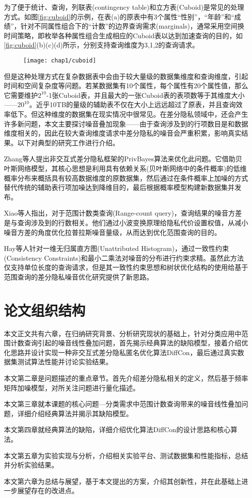 为了便于统计、查询，列联表(contingency table)和立方表(Cuboid)是常见的处理方式。如图\ref{fig:cuboid}的示例，在表(a)的原表中有3个属性“性别”，“年龄”和“成绩”，针对不同属性组合下的“计数”的边界查询需求(marginals\cite{marginals})，通常采用空间换时间策略，即枚举各种属性组合生成相应的Cuboid表以达到加速查询的目的，如\ref{fig:cuboid}(b)(c)(d)所示，分别支持查询维度为3,1,2的查询请求。

\begin{figure}[!htp]
	\centering
	\texttt{[image: chap1/cuboid]}
\end{figure}

但是这种处理方式在复杂数据表中会由于较大量级的数据集维度和查询维度，引起时间和空间复杂度等问题。若某数据集有10个属性，每个属性有20个属性值，那么它需要维护$2^{10}$-1张Cuboid表，并且最大的一张Cuboid表的表项数等于其维度大小——$20^{10}$。近乎10TB的量级的辅助表不仅在大小上远远超过了原表，并且查询效率低下。但这种维度的数据集在现实情况中很常见。在差分隐私领域中，还会产生许多新问题，本文主要探讨噪音叠加现象——由于查询涉及到的行项数目是和数据维度相关的，因此在较大查询维度请求中差分隐私的噪音会严重积累，影响真实结果。以下对典型的研究工作进行介绍。

Zhang\cite{privbayes}等人提出非交互式差分隐私框架的PrivBayes算法来优化此问题。它借助贝叶斯网络模型，其核心思想是利用具有依赖关系(贝叶斯网络中的条件概率)的低维概率分布来概括具有较高数据维度的原数据集，然后通过在条件概率上加噪的方式替代传统的辅助表行项加噪达到降维目的，最后根据概率模型构建新数据集并发布。

Xiao\cite{wavelet}等人指出，对于范围计数类查询(Range-count query)，查询结果的噪音方差是与查询涉及到的行数相关。他们通过小波变换原理给隐私代价设置权值，从减小噪音方差的角度优化拉普拉斯噪音量级，从而达到优化范围查询的目的。

Hay\cite{boosting}等人针对一维无归属直方图(Unattributed Histogram)，通过一致性约束(Consistency Constraints)和最小二乘法对噪音的分布进行约束求精。虽然此方法仅支持单位长度的查询请求，但是其一致性约束思想和树状优化结构的使用给基于范围查询的差分隐私噪音优化研究提供了新思路。

\section{论文组织结构}

本文正文共有六章，在归纳研究背景、分析研究现状的基础上，针对分类应用中范围计数查询引起的噪音线性叠加问题，首先揭示经典算法的缺陷模型，接着介绍优化思路并设计实现一种非交互式差分隐私匿名优化算法DiffCon，最后通过真实数据集测试算法性能并讨论实验结果。

本文第二章是问题描述的重点章节。首先介绍差分隐私相关的定义，然后基于频率矩阵加噪模型，对所关注问题进行量化描述。

本文第三章就本课题的核心问题---分类需求中范围计数查询带来的噪音线性叠加问题，详细介绍经典算法并揭示其缺陷模型。

本文第四章就经典算法的缺陷，详细介绍优化算法DiffCon的设计思路和核心算法。

本文第五章为实验实现与分析，介绍相关实验平台、测试数据集和性能指标，总结并分析实验结果。

本文第六章为总结与展望，基于本文提出的方案，介绍其创新性，并在此基础上进一步展望存在的改进点。